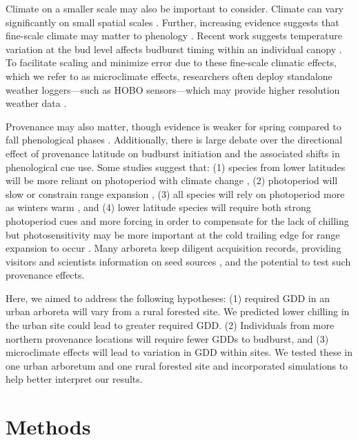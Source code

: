 \documentclass{article}\usepackage[]{graphicx}\usepackage[]{color}
\begin{document}
Climate on a smaller scale may also be important to consider. Climate can vary significantly on small spatial scales \citep[][e.g., as much as 2.6$^{\circ}$C between sensors at the same vineyard or up to 6.6$^{\circ}$C within 1 km spatial units in northern Europe]{deResseguier2020,Lenoir2013}. Further, increasing evidence suggests that fine-scale climate may matter to phenology \citep{Lembrechts2019}. Recent work suggests temperature variation at the bud level affects budburst timing within an individual canopy \citep{Lembrechts2019}. To facilitate scaling and minimize error due to these fine-scale climatic effects, which we refer to as microclimate effects, researchers often deploy standalone weather loggers---such as HOBO sensors---which may provide higher resolution weather data \citep{Schwartz2013a,Whiteman2000}. 
 
Provenance may also matter, though evidence is weaker for spring compared to fall phenological phases \citep{Aitken2015, McKown2013, Vico2021}. Additionally, there is large debate over the directional effect of provenance latitude on budburst initiation and the associated shifts in phenological cue use. Some studies suggest that: (1) species from lower latitudes will be more reliant on photoperiod with climate change \citep{Zohner2016}, (2) photoperiod will slow or constrain range expansion \citep{Saikkonen2012}, (3) all species will rely on photoperiod more as winters warm \citep{Way2015}, and (4) lower latitude species will require both strong photoperiod cues and more forcing in order to compensate for the lack of chilling but photosensitivity may be more important at the cold trailing edge for range expansion to occur \citep{Gauzere2017}. Many arboreta keep diligent acquisition records, providing visitors and scientists information on seed sources \citep{Dosmann2006}, and the potential to test such provenance effects.

Here, we aimed to address the following hypotheses: (1) required GDD in an urban arboreta will vary from a rural forested site. We predicted lower chilling in the urban site could lead to greater required GDD. (2) Individuals from more northern provenance locations will require fewer GDDs to budburst, and (3) microclimate effects will lead to variation in GDD within sites. We tested these in one urban arboretum and one rural forested site and incorporated simulations to help better interpret our results. 

\section*{Methods}
\end{document}

